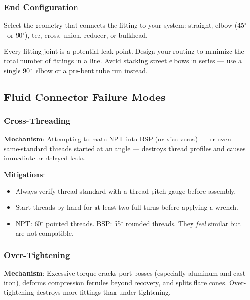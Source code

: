 \documentclass[11pt,letterpaper,twoside,openany]{book}
\providecommand{\ang}[1]{#1\ensuremath{{}^{\circ}}}
\begin{document}
\subsubsection{End Configuration}

Select the geometry that connects the fitting to your system: straight, elbow (45$^{\circ}$\ or 90$^{\circ}$), tee, cross, union, reducer, or bulkhead. 

\begin{tipbox}
Every fitting joint is a potential leak point. Design your routing to minimize the total number of fittings in a line. Avoid stacking street elbows in series --- use a single 90$^{\circ}$\ elbow or a pre-bent tube run instead.
\end{tipbox}


\subsection{Fluid Connector Failure Modes}
\label{sec:fluidfailure}

\subsubsection{Cross-Threading}

\textbf{Mechanism}: Attempting to mate NPT into BSP (or vice versa) --- or even same-standard threads started at an angle --- destroys thread profiles and causes immediate or delayed leaks.

\textbf{Mitigations}:
\begin{itemize}[nosep,leftmargin=1.5em]
  \item Always verify thread standard with a thread pitch gauge before assembly.
  \item Start threads by hand for at least two full turns before applying a wrench.
  \item NPT: \ang{60} pointed threads. BSP: \ang{55} rounded threads. They \emph{feel} similar but are not compatible.
\end{itemize}

\subsubsection{Over-Tightening}

\textbf{Mechanism}: Excessive torque cracks port bosses (especially aluminum and cast iron), deforms compression ferrules beyond recovery, and splits flare cones. Over-tightening destroys more fittings than under-tightening.
\end{document}
